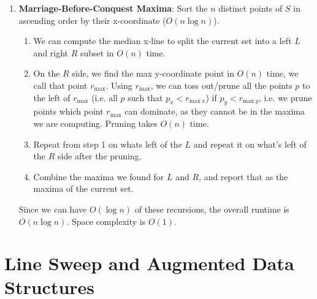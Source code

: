 \documentclass [12pt]{article}
\begin{document}
\begin{enumerate}[label=\alph*.]
            \item \textbf{Marriage-Before-Conquest Maxima}\footnotemark[1]: Sort the $n$ distinct points of $S$ in ascending order by their x-coordinate ($O(n\log n)$). 
            
                \begin{enumerate}[label=\arabic*)]
                    \item We can compute the median x-line to split the current set into a left $L$ and right $R$ subset in $O(n)$ time. 
                    
                    \item On the $R$ side, we find the max y-coordinate point in $O(n)$ time, we call that point $r_\text{max}$. Using $r_\text{max}$, we can toss out/prune all the points $p$ to the left of $r_\text{max}$ (i.e. all $p$ such that $p_x < r_{\text{max}\ x}$) if $p_y < r_{\text{max}\ y}$, i.e. we prune points which point $r_\text{max}$ can dominate, as they cannot be in the maxima we are computing. Pruning takes $O(n)$ time.
                    
                    \item Repeat from step 1 on whats left of the $L$ and repeat it on what's left of the $R$ side after the pruning. 
                    
                    \item Combine the maxima we found for $L$ and $R$, and report that as the maxima of the current set.
                \end{enumerate}

            Since we can have $O(\log n)$ of these recursions, the overall runtime is $O(n\log n)$. Space complexity is $O(1)$.
        \end{enumerate}
        
    \pagebreak

    
    \section{Line Sweep and Augmented Data Structures}
    \label{sec:two}
\end{document}
